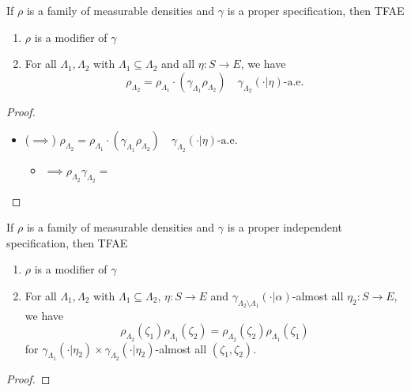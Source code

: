 \begin{proposition}
    \label{prop:modif-char}
    \leanok{}

    If $\rho$ is a family of measurable densities and $\gamma$ is a proper specification, then TFAE
    \begin{enumerate}
        \item $\rho$ is a modifier of $\gamma$
        \item For all $\Lambda_1, \Lambda_2$ with $\Lambda_1 \subseteq \Lambda_2$ and all $\eta : S \to E$, we have
        \[\rho_{\Lambda_2} = \rho_{\Lambda_1}\cdot (\gamma_{\Lambda_1} \rho_{\Lambda_2}) \quad \gamma_{\Lambda_2}(\cdot|\eta)\text{-a.e.}\]
    \end{enumerate}
\end{proposition}
\begin{proof}

    \begin{itemize}
        \item ($\implies$) $\rho_{\Lambda_2} = \rho_{\Lambda_1}\cdot (\gamma_{\Lambda_1} \rho_{\Lambda_2}) \quad \gamma_{\Lambda_2}(\cdot|\eta)\text{-a.e.}$
        \begin{itemize}
            \item $\implies \rho_{\Lambda_2}\gamma_{\Lambda_2} = $
        \end{itemize}
    \end{itemize}

\end{proof}

\begin{proposition}
    \label{prop:modif-indep-char}
    \leanok{}

    If $\rho$ is a family of measurable densities and $\gamma$ is a proper independent specification, then TFAE
    \begin{enumerate}
        \item $\rho$ is a modifier of $\gamma$
        \item For all $\Lambda_1, \Lambda_2$ with $\Lambda_1 \subseteq \Lambda_2$, $\eta : S \to E$ and $\gamma_{\Lambda_2 \setminus \Lambda_1}(\cdot|\alpha)$-almost all $\eta_2 : S \to E$, we have
        \[\rho_{\Lambda_2}(\zeta_1)\rho_{\Lambda_1}(\zeta_2) = \rho_{\Lambda_2}(\zeta_2) \rho_{\Lambda_1}(\zeta_1)\]
        for $\gamma_{\Lambda_1}(\cdot|\eta_2) \times \gamma_{\Lambda_2}(\cdot|\eta_2)$-almost all $(\zeta_1, \zeta_2)$.
    \end{enumerate}
\end{proposition}
\begin{proof}

\end{proof}

